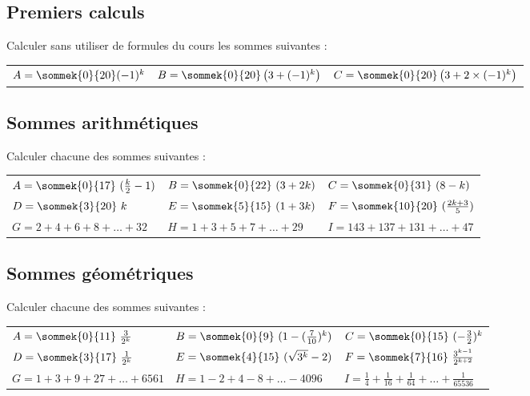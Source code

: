 \documentclass[oneside,12pt]{book}          %
\begin{document}
\subsection{Premiers calculs}
Calculer sans utiliser de formules du cours les sommes suivantes :

\begin{tabular}{p{} p{} p{}}
     $A=\sommek{0}{20}(-1)^k$ & $B=\sommek{0}{20}\left(3+(-1)^k\right)$ & $C=\sommek{0}{20}\left(3+2\times(-1)^k\right)$
\end{tabular}


\subsection{Sommes arithmétiques}
Calculer chacune des sommes suivantes :
 
\renewcommand{\arraystretch}{2.2}
\begin{tabular}{p{} p{} p{}}
     $A=\sommek{0}{17}~(\frac{k}{2}-1)$ & $B=\sommek{0}{22}~(3+2k)$ & $C=\sommek{0}{31}~(8-k)$ \\
     $D=\sommek{3}{20}~k$ & $E=\sommek{5}{15}~(1+3k)$ & $F=\sommek{10}{20}~(\frac{2k+3}{5})$ \\
     $G=2+4+6+8+\ldots+32$ & $H=1+3+5+7+\ldots+29$ & $I=143+137+131+\ldots+47$ \\
\end{tabular}



\subsection{Sommes géométriques}
Calculer chacune des sommes suivantes :

\renewcommand{\arraystretch}{2.5}
\begin{tabular}{p{} p{} p{}}
    $A=\sommek{0}{11}~\frac{3}{2^{k}}$ & $B=\sommek{0}{9}~(1-(\frac{7}{10})^{k}) $ & $C=\sommek{0}{15}~(-\frac{3}{2})^{k} $ \\
    $D=\sommek{3}{17}~\frac{1}{2^{k}} $ & $E=\sommek{4}{15}~(\sqrt{3^{k}}-2) $ & $F=\sommek{7}{16} ~\frac{3^{k-1}}{2^{k+2}}$ \\
     $G=1+3+9+27+\ldots+6561$ & $H=1-2+4-8+\ldots-4096$ & $I=\frac{1}{4}+\frac{1}{16}+\frac{1}{64}+\ldots+\frac{1}{65536}$    
\end{tabular}
\end{document}
